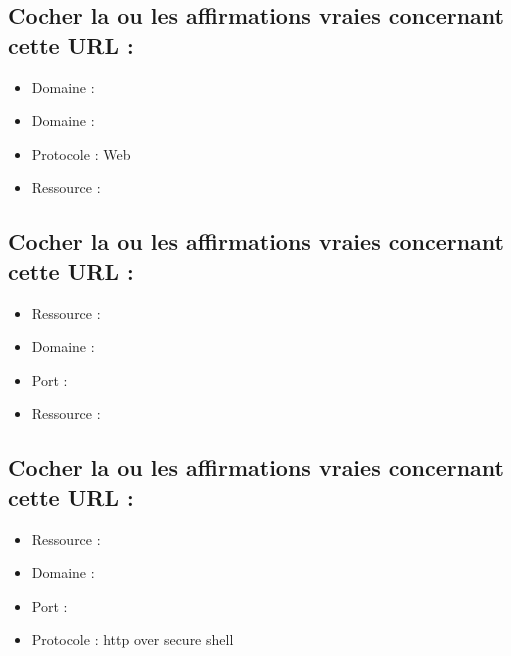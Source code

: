 \documentclass[11pt,a4paper]{article}
\begin{document}
\subsection{Cocher la ou les affirmations vraies concernant cette URL :}


\bigskip

\begin{itemize}
\item[\CaseCoche] Domaine :  \\
\item[\CaseCoche] Domaine :  \\
\item[\CaseCoche] Protocole : Web \\
\item[\CaseCoche] Ressource :  \\
\end{itemize}


\subsection{Cocher la ou les affirmations vraies concernant cette URL :}


\bigskip

\begin{itemize}
\item[\CaseCoche] Ressource :  \\
\item[\CaseCoche] Domaine :  \\
\item[\CaseCoche] Port :  \\
\item[\CaseCoche] Ressource :  \\
\end{itemize}


\subsection{Cocher la ou les affirmations vraies concernant cette URL :}


\bigskip

\begin{itemize}
\item[\CaseCoche] Ressource :  \\
\item[\CaseCoche] Domaine :  \\
\item[\CaseCoche] Port :  \\
\item[\CaseCoche] Protocole : http over secure shell \\
\end{itemize}
\end{document}
